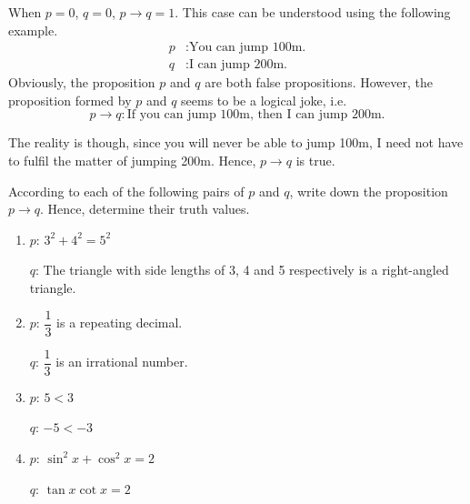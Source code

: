 \documentclass{report}
\newcounter{example}
\begin{document}
When $p = 0$, $q = 0$, $p \rightarrow q = 1$. This case can be understood using
the following example.
\begin{align*}
    p & : \text{You can jump 100m.} \\
    q & : \text{I can jump 200m.}
\end{align*}
Obviously, the proposition $p$ and $q$ are both false propositions. However, the proposition formed by $p$ and $q$ seems to be a logical joke, i.e.
\[p \rightarrow q : \text{If you can jump 100m, then I can jump 200m.}\]

The reality is though, since you will never be able to jump 100m, I need not
have to fulfil the matter of jumping 200m. Hence, $p \rightarrow q$ is true.
\vspace{0.5cm}
\begin{example}
    \item According to each of the following pairs of $p$ and $q$, write down the
    proposition $p \rightarrow q$. Hence, determine their truth values.
    \begin{enumerate}[label=(\alph*), leftmargin=*]
        \item $p$: $3^2 + 4^2 = 5^2$

              $q$: The triangle with side lengths of 3, 4 and 5 respectively is a right-angled triangle.

        \item $p$: $\dfrac{1}{3}$ is a repeating decimal.

              $q$: $\dfrac{1}{3}$ is an irrational number.

        \item $p$: $5 < 3$

              $q$: $-5 < -3$

        \item $p$: $\sin^2 x + \cos^2 x = 2$

              $q$: $\tan x \cot x = 2$
    \end{enumerate}
\end{example}
\end{document}
